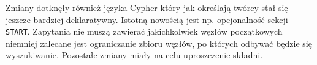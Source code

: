 \documentclass{xmgr}
\begin{document}
Zmiany dotknęły również języka Cypher który jak określają twórcy stał się jeszcze bardziej deklaratywny. Istotną nowością jest np. opcjonalność sekcji \texttt{START}. Zapytania nie muszą zawierać jakichkolwiek węzłów początkowych niemniej zalecane jest ograniczanie zbioru węzłów, po których odbywać będzie się wyszukiwanie. Pozostałe zmiany miały na celu uproszczenie składni.




\listoftables

\listoffigures

\oswiadczenie
\end{document}
